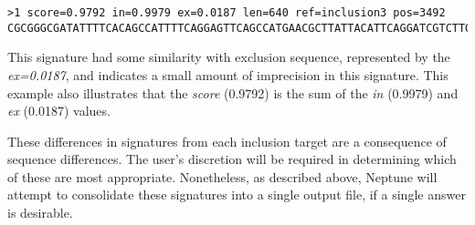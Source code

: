 \documentclass[a4paper,10pt]{article}
\begin{document}
\begin{minipage}{\linewidth}
\begin{lstlisting}[frame=single, style=bash]
>1 score=0.9792 in=0.9979 ex=0.0187 len=640 ref=inclusion3 pos=3492
CGCGGGCGATATTTTCACAGCCATTTTCAGGAGTTCAGCCATGAACGCTTATTACATTCAGGATCGTCTTGAGGCTCAGA...
\end{lstlisting}
\end{minipage}

This signature had some similarity with exclusion sequence, represented by the \textit{ex=0.0187}, and indicates a small amount of imprecision in this signature. This example also illustrates that the \textit{score} (0.9792) is the sum of the \textit{in} (0.9979) and \textit{ex} (0.0187) values.

These differences in signatures from each inclusion target are a consequence of sequence differences. The user's discretion will be required in determining which of these are most appropriate. Nonetheless, as described above, Neptune will attempt to consolidate these signatures into a single output file, if a single answer is desirable.
\end{document}
